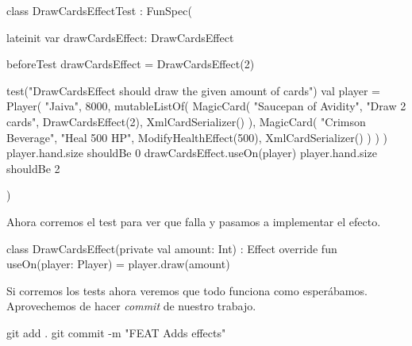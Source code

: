   \begin{kotlin}
    class DrawCardsEffectTest : FunSpec({
      lateinit var drawCardsEffect: DrawCardsEffect

      beforeTest {
        drawCardsEffect = DrawCardsEffect(2)
      }

      test("DrawCardsEffect should draw the given amount of cards") {
        val player = Player(
          "Jaiva", 8000, mutableListOf(
            MagicCard(
              "Saucepan of Avidity",
              "Draw 2 cards",
              DrawCardsEffect(2),
              XmlCardSerializer()
            ),
            MagicCard(
              "Crimson Beverage",
              "Heal 500 HP",
              ModifyHealthEffect(500),
              XmlCardSerializer()
            )
          )
        )
        player.hand.size shouldBe 0
        drawCardsEffect.useOn(player)
        player.hand.size shouldBe 2
      }
    })
  \end{kotlin}
    
  Ahora corremos el test para ver que falla y pasamos a implementar el efecto.

  \begin{kotlin}
    class DrawCardsEffect(private val amount: Int) : Effect {
      override fun useOn(player: Player) = player.draw(amount)
    }
  \end{kotlin}

  Si corremos los tests ahora veremos que todo funciona como esperábamos.
  Aprovechemos de hacer \textit{commit} de nuestro trabajo.

  \begin{powershell}
    git add .
    git commit -m "FEAT Adds effects"
  \end{powershell}
